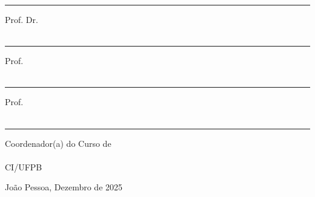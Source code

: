 \documentclass{tcc}
\begin{document}
\vspace{0.7in}

\hrule
\noindent Prof. Dr. \profa\\
\insta\\

\vspace{0.25in}

\hrule
\noindent Prof. \profb\\
\instb\\

\vspace{0.25in}

\hrule
\noindent Prof. \profc\\
\instc\\

\vspace{0.8in}

\hrule
\noindent Coordenador(a) do Curso de \departamento\\
\coordenador\\
CI/UFPB\\

\vfill

\begin{center}
João Pessoa, Dezembro de 2025
\end{center}

\afterpage{\blankpage \addtocounter{page}{1}}

\newpage
\section*{}


\newpage


\newpage


\newpage


\newpage
\renewcommand{\listfigurename}{\centering LISTA DE FIGURAS}
\listoffigures

\newpage
\renewcommand{\listtablename}{\centering LISTA DE TABELAS}
\listoftables

\newpage


\newpage
\pagestyle{plain} %
\tableofcontents

\newpage










\renewcommand{\refname}{\centering REFERÊNCIAS}
\begin{thebibliography}{99}

\end{thebibliography}


\end{document}
